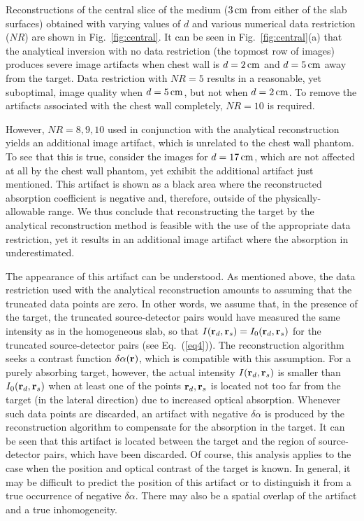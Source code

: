 Reconstructions of the central slice of the medium ($3\,{\rm cm}$ from either of the slab surfaces) obtained with varying values of $d$ and various numerical data restriction ($NR$) are shown in Fig.~\ref{fig:central}. It can be seen in Fig.~\ref{fig:central}(a) that the analytical inversion with no data restriction (the topmost row of images) produces severe image artifacts when chest wall is $d=2\,{\rm cm}$ and $d=5\,{\rm cm}$ away from the target. Data restriction with $NR=5$ results in a reasonable, yet suboptimal, image quality when $d=5\,{\rm cm}$, but not when $d=2\,{\rm cm}$. To remove
the artifacts associated with the chest wall completely, $NR=10$ is required.

However, $NR = 8,9,10$ used in conjunction with the analytical reconstruction yields an additional image artifact, which is unrelated to the chest wall phantom. To see that this is true, consider the images for $d=17\,{\rm cm}$, which are not affected at all by the chest wall phantom, yet exhibit the additional artifact just mentioned. This artifact is shown as a black area where the reconstructed absorption coefficient is negative and, therefore, outside of the physically-allowable range. We thus conclude that reconstructing the target by the analytical reconstruction method is feasible with the use of the appropriate data restriction, yet it results in an additional image artifact where the absorption in underestimated. 

The appearance of this artifact can be understood. As mentioned above, the data restriction used with the analytical reconstruction amounts to assuming that the truncated data points are zero. In other words, we assume that, in the presence of the target, the truncated source-detector pairs would have measured the same intensity as in the homogeneous slab, so that $I({\bf r}_d,{\bf r}_s) = I_0({\bf r}_d,{\bf r}_s)$ for the truncated source-detector pairs
(see Eq.~(\ref{eq4})). The reconstruction algorithm seeks a contrast function $\delta\alpha({\bf r})$, which is compatible with this assumption.  For a purely absorbing target, however, the actual intensity $I({\bf r}_d,{\bf r}_s)$ is smaller than $I_0({\bf r}_d,{\bf r}_s)$ when at least one of the points ${\bf r}_d,{\bf r}_s$ is located not too far from the target (in the lateral direction) due to increased optical absorption. Whenever such data points are discarded,
an artifact with negative $\delta\alpha$ is produced by the reconstruction algorithm to compensate for the absorption in the target. It can be seen that this artifact is located between the target and the region of source-detector pairs, which have been discarded. Of course, this analysis applies to the case when the position and optical contrast of the target is known.  In general, it may be difficult to predict the position of this artifact or to distinguish it from a true occurrence of negative $\delta\alpha$. There may also be a spatial overlap of the artifact and a true inhomogeneity.

